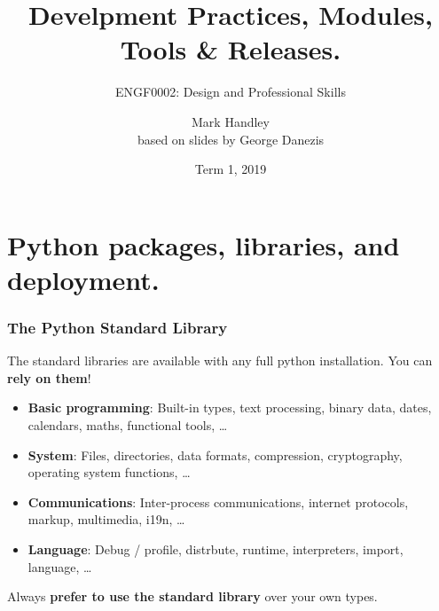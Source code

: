 \documentclass{beamer} %
\author{Mark Handley\\
  {\small based on slides by George Danezis}}
\title{Develpment Practices, Modules, Tools \& Releases.}
\subtitle{ENGF0002: Design and Professional Skills }
\date{Term 1, 2019}
\newcommand\emc[1]{\textcolor{midred}{\textbf{#1}}}
\begin{document}
\nobibliography*


\frame{
\titlepage
}

\section{Python packages, libraries, and deployment.}



\begin{frame}

\frametitle{The Python Standard Library}

The standard libraries are available with any full python installation. You can \emc{rely on them}!
\begin{itemize}
  \item \emc{Basic programming}: Built-in types, text processing, binary data, dates, calendars, maths, functional tools, \ldots
  \item \emc{System}: Files, directories, data formats, compression, cryptography, operating system functions, \ldots
  \item \emc{Communications}: Inter-process communications, internet protocols, markup, multimedia, i19n, \ldots
  \item \emc{Language}: Debug / profile, distrbute, runtime, interpreters, import, language, \ldots
  \end{itemize}

Always \emc{prefer to use the standard library} over your own types.

\end{frame}
\end{document}

